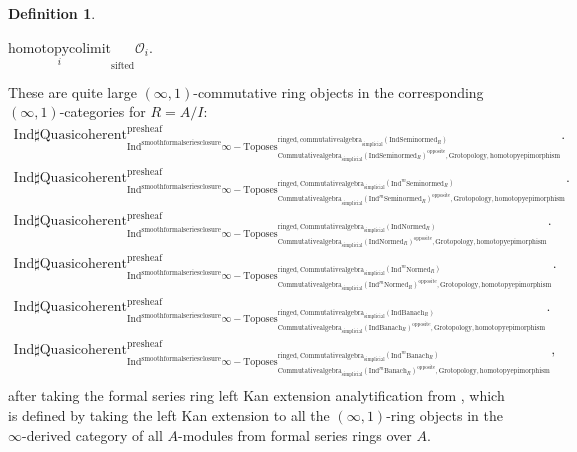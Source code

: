\documentclass[11pt]{book}
\theoremstyle{definition}
\newtheorem{definition}[theorem]{Definition}
\numberwithin{equation}{section}
\begin{document}
\begin{definition}
\begin{center}
$\underset{i}{\text{homotopycolimit}}_\text{sifted}\mathcal{O}_i$.
\end{center}
These are quite large $(\infty,1)$-commutative ring objects in the corresponding $(\infty,1)$-categories for $R=A/I$:
\begin{align}
\mathrm{Ind}\mathrm{\sharp Quasicoherent}^{\text{presheaf}}_{\mathrm{Ind}^\text{smoothformalseriesclosure}\infty-\mathrm{Toposes}^{\mathrm{ringed},\mathrm{commutativealgebra}_{\mathrm{simplicial}}(\mathrm{Ind}\mathrm{Seminormed}_R)}_{\mathrm{Commutativealgebra}_{\mathrm{simplicial}}(\mathrm{Ind}\mathrm{Seminormed}_R)^\mathrm{opposite},\mathrm{Grotopology,homotopyepimorphism}}}. \\
\mathrm{Ind}\mathrm{\sharp Quasicoherent}^{\text{presheaf}}_{\mathrm{Ind}^\text{smoothformalseriesclosure}\infty-\mathrm{Toposes}^{\mathrm{ringed},\mathrm{Commutativealgebra}_{\mathrm{simplicial}}(\mathrm{Ind}^m\mathrm{Seminormed}_R)}_{\mathrm{Commutativealgebra}_{\mathrm{simplicial}}(\mathrm{Ind}^m\mathrm{Seminormed}_R)^\mathrm{opposite},\mathrm{Grotopology,homotopyepimorphism}}}.\\
\mathrm{Ind}\mathrm{\sharp Quasicoherent}^{\text{presheaf}}_{\mathrm{Ind}^\text{smoothformalseriesclosure}\infty-\mathrm{Toposes}^{\mathrm{ringed},\mathrm{Commutativealgebra}_{\mathrm{simplicial}}(\mathrm{Ind}\mathrm{Normed}_R)}_{\mathrm{Commutativealgebra}_{\mathrm{simplicial}}(\mathrm{Ind}\mathrm{Normed}_R)^\mathrm{opposite},\mathrm{Grotopology,homotopyepimorphism}}}.\\
\mathrm{Ind}\mathrm{\sharp Quasicoherent}^{\text{presheaf}}_{\mathrm{Ind}^\text{smoothformalseriesclosure}\infty-\mathrm{Toposes}^{\mathrm{ringed},\mathrm{Commutativealgebra}_{\mathrm{simplicial}}(\mathrm{Ind}^m\mathrm{Normed}_R)}_{\mathrm{Commutativealgebra}_{\mathrm{simplicial}}(\mathrm{Ind}^m\mathrm{Normed}_R)^\mathrm{opposite},\mathrm{Grotopology,homotopyepimorphism}}}.\\
\mathrm{Ind}\mathrm{\sharp Quasicoherent}^{\text{presheaf}}_{\mathrm{Ind}^\text{smoothformalseriesclosure}\infty-\mathrm{Toposes}^{\mathrm{ringed},\mathrm{Commutativealgebra}_{\mathrm{simplicial}}(\mathrm{Ind}\mathrm{Banach}_R)}_{\mathrm{Commutativealgebra}_{\mathrm{simplicial}}(\mathrm{Ind}\mathrm{Banach}_R)^\mathrm{opposite},\mathrm{Grotopology,homotopyepimorphism}}}.\\
\mathrm{Ind}\mathrm{\sharp Quasicoherent}^{\text{presheaf}}_{\mathrm{Ind}^\text{smoothformalseriesclosure}\infty-\mathrm{Toposes}^{\mathrm{ringed},\mathrm{Commutativealgebra}_{\mathrm{simplicial}}(\mathrm{Ind}^m\mathrm{Banach}_R)}_{\mathrm{Commutativealgebra}_{\mathrm{simplicial}}(\mathrm{Ind}^m\mathrm{Banach}_R)^\mathrm{opposite},\mathrm{Grotopology,homotopyepimorphism}}},\\ 
\end{align}
after taking the formal series ring left Kan extension analytification from \cite[Section 4.2]{BBM}, which is defined by taking the left Kan extension to all the $(\infty,1)$-ring objects in the $\infty$-derived category of all $A$-modules from formal series rings over $A$.\\
\end{definition}
\end{document}
